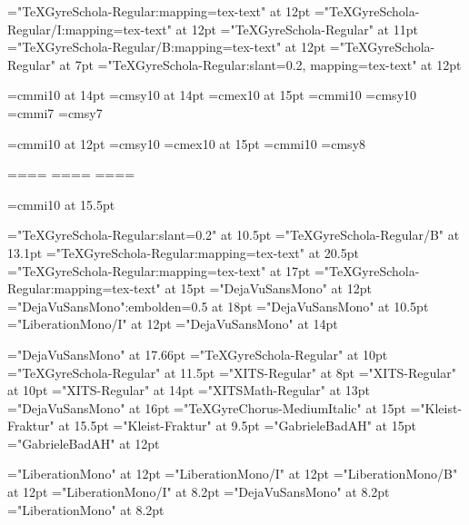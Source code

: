 \font\tenrm="TeXGyreSchola-Regular:mapping=tex-text" at 12pt     \font\tenit="TeXGyreSchola-Regular/I:mapping=tex-text" at 12pt
\font\diezrm="TeXGyreSchola-Regular" at 11pt                     \font\tenbf="TeXGyreSchola-Regular/B:mapping=tex-text" at 12pt
\font\fiverm="TeXGyreSchola-Regular" at 7pt                      \font\tensl="TeXGyreSchola-Regular:slant=0.2, mapping=tex-text" at 12pt

\font\teni=cmmi10 at 14pt    \font\tensy=cmsy10 at 14pt    \font\tenex=cmex10 at 15pt
\font\seveni=cmmi10           \font\sevensy=cmsy10
\font\fivei=cmmi7            \font\fivesy=cmsy7

\font\tenipeq=cmmi10 at 12pt    \font\tensypeq=cmsy10    \font\tenex=cmex10 at 15pt
\font\sevenipeq=cmmi10           \font\sevenypeq=cmsy8

=\tenrm              {}=\teni             {}=\tensy             {}=\tenex
{}=\sevenrm          {}=\seveni         {}=\sevensy         {}=\tenex
{}=\fiverm     {}=\fivei    {}=\fivesy    {}=\tenex

\font\mathlista=cmmi10 at 15.5pt

\font\ffoot="TeXGyreSchola-Regular:slant=0.2" at 10.5pt
\font\fnumpag="TeXGyreSchola-Regular/B" at 13.1pt
\font\fencp="TeXGyreSchola-Regular:mapping=tex-text" at 20.5pt
\font\fencs="TeXGyreSchola-Regular:mapping=tex-text" at 17pt
\font\fenct="TeXGyreSchola-Regular:mapping=tex-text" at 15pt
\font\fcode="DejaVuSansMono" at 12pt
\font\fc="DejaVuSansMono":embolden=0.5 at 18pt
\font\fcfoot="DejaVuSansMono" at 10.5pt
\font\fcodenoterm="LiberationMono/I" at 12pt
\font\fcodej="DejaVuSansMono" at 14pt

\font\festrella="DejaVuSansMono" at 17.66pt
\font\fpies="TeXGyreSchola-Regular" at 10pt
\font\fitems="TeXGyreSchola-Regular" at 11.5pt
\font\fsimbs="XITS-Regular" at 8pt
\font{}="XITS-Regular" at 10pt
\font\fsimbols="XITS-Regular" at 14pt
\font\fmats="XITSMath-Regular" at 13pt
\font\fflecha="DejaVuSansMono" at 16pt
\font\machine="TeXGyreChorus-MediumItalic" at 15pt
\font\ffraktur="Kleist-Fraktur" at 15.5pt
\font\ffraktursub="Kleist-Fraktur" at 9.5pt
\font\fgabriele="GabrieleBadAH" at 15pt
\font\fgabrielen="GabrieleBadAH" at 12pt


\font\fgramat="LiberationMono" at 12pt
\font\fgramatnoterm="LiberationMono/I" at 12pt
\font\fgramatterm="LiberationMono/B" at 12pt
\font\fsupnoterm="LiberationMono/I" at 8.2pt
\font\fsup="DejaVuSansMono" at 8.2pt
\font\fgramatsup="LiberationMono" at 8.2pt


